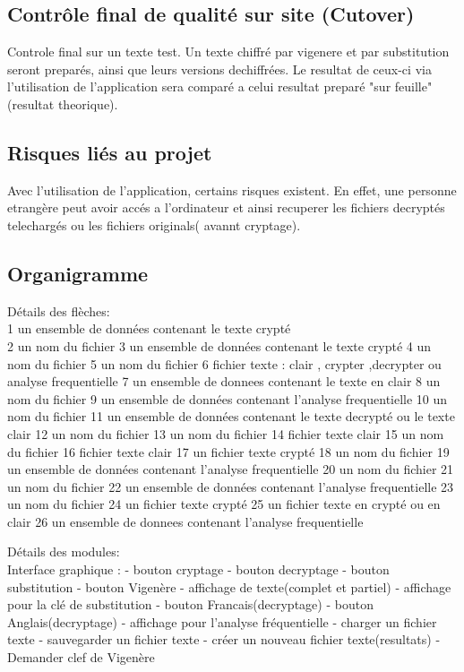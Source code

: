 \documentclass[a4]{article}
\begin{document}
		
		
		\subsection{Contrôle final de qualité sur site (Cutover)}
		Controle final sur un texte test. Un texte chiffré par vigenere et par substitution seront preparés, ainsi que 			leurs versions dechiffrées. Le resultat de ceux-ci via l'utilisation de l'application sera comparé a celui resultat 				preparé "sur feuille"(resultat theorique). 
		\subsection{Risques liés au projet}
		Avec l'utilisation de l'application, certains risques existent. En effet, une personne etrangère peut avoir 			accés a l'ordinateur et ainsi recuperer les fichiers decryptés telechargés ou les fichiers originals( avannt cryptage).
		\subsection{Organigramme}
		

Détails des flèches:\\
1 un ensemble de données contenant le texte crypté\\
2 un nom du fichier
3 un ensemble de données contenant le texte crypté
4 un nom du fichier
5 un nom du fichier
6 fichier texte : clair , crypter ,decrypter ou analyse frequentielle
7 un ensemble de donnees contenant le texte en clair
8 un nom du fichier
9 un ensemble de données contenant l'analyse frequentielle
10 un nom du fichier
11 un ensemble de données contenant le texte decrypté ou le texte clair
12 un nom du fichier
13 un nom du fichier
14 fichier texte clair
15 un nom du fichier
16 fichier texte clair
17 un fichier texte crypté
18 un nom du fichier
19 un ensemble de données contenant l'analyse frequentielle
20 un nom du fichier
21 un nom du fichier
22 un ensemble de données contenant l'analyse frequentielle
23 un nom du fichier
24 un fichier texte crypté
25 un fichier texte en crypté ou en clair
26 un ensemble de donnees contenant l'analyse frequentielle

Détails des modules:\\
		Interface graphique :
			- bouton cryptage
			- bouton decryptage
			- bouton substitution
			- bouton Vigenère
			- affichage de texte(complet et partiel)
			- affichage pour la clé de substitution
			- bouton Francais(decryptage)
			- bouton Anglais(decryptage)
			- affichage pour l'analyse fréquentielle
			- charger un fichier texte
			- sauvegarder un fichier texte
			- créer un nouveau fichier texte(resultats)
			- Demander clef de Vigenère
			
\end{document}
